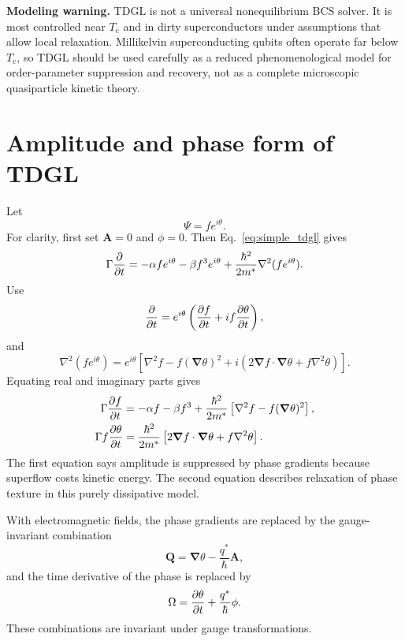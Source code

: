 \documentclass[11pt]{article}
\numberwithin{equation}{section}
\newcommand{\Avec}{\bm{A}}
\renewcommand{\grad}{\bm{\nabla}}
\newcommand{\lap}{\nabla^2}
\newcommand{\Tc}{T_{\mathrm{c}}}
\newcommand{\Ord}{\Psi}
\newcommand{\GammaTD}{\Gamma}
\begin{document}
\begin{notebox}
\textbf{Modeling warning.} TDGL is not a universal nonequilibrium BCS solver. It is most controlled near $\Tc$ and in dirty superconductors under assumptions that allow local relaxation. Millikelvin superconducting qubits often operate far below $\Tc$, so TDGL should be used carefully as a reduced phenomenological model for order-parameter suppression and recovery, not as a complete microscopic quasiparticle kinetic theory.
\end{notebox}

\section{Amplitude and phase form of TDGL}

Let
\begin{equation}
\Ord=f e^{i\theta}.
\end{equation}
For clarity, first set $\Avec=0$ and $\phi=0$. Then Eq.~\eqref{eq:simple_tdgl} gives
\begin{equation}
\GammaTD\pdv{}{t}(f e^{i\theta})=-\alpha f e^{i\theta}-\beta f^3 e^{i\theta}+\frac{\hbar^2}{2m^*}\lap(f e^{i\theta}).
\end{equation}
Use
\begin{equation}
\pdv{}{t}(f e^{i\theta})=e^{i\theta}\left(\pdv{f}{t}+if\pdv{\theta}{t}\right),
\end{equation}
and
\begin{equation}
\lap(f e^{i\theta})=e^{i\theta}\left[\lap f-f(\grad\theta)^2+i\left(2\grad f\cdot\grad\theta+f\lap\theta\right)\right].
\end{equation}
Equating real and imaginary parts gives
\begin{align}
\GammaTD\pdv{f}{t}&=-\alpha f-\beta f^3+\frac{\hbar^2}{2m^*}\left[\lap f-f(\grad\theta)^2\right],\\
\GammaTD f\pdv{\theta}{t}&=\frac{\hbar^2}{2m^*}\left[2\grad f\cdot\grad\theta+f\lap\theta\right].
\end{align}
The first equation says amplitude is suppressed by phase gradients because superflow costs kinetic energy. The second equation describes relaxation of phase texture in this purely dissipative model.

With electromagnetic fields, the phase gradients are replaced by the gauge-invariant combination
\begin{equation}
\bm{Q}=\grad\theta-\frac{q^*}{\hbar}\Avec,
\end{equation}
and the time derivative of the phase is replaced by
\begin{equation}
\Omega=\pdv{\theta}{t}+\frac{q^*}{\hbar}\phi.
\end{equation}
These combinations are invariant under gauge transformations.
\end{document}
